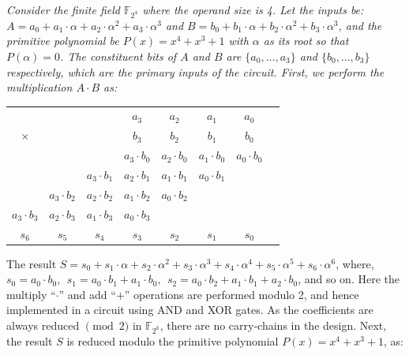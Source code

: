 \begin{Example}
\label{exp1}
{\it 
Consider the finite field $\mathbb{F}_{2^4}$ where the operand size is 4. Let the inputs be:
$A=a_0+a_1\cdot \alpha+a_2\cdot \alpha^2+a_3\cdot \alpha^3$ and
$B=b_0+b_1\cdot \alpha+b_2\cdot \alpha^2+b_3\cdot \alpha^3$, and 
 the primitive polynomial be $P(x)=x^4+x^3+1$ with $\alpha$ as its
 root so that $P(\alpha) = 0$.  
The constituent bits of $A$  and $B$ are $\{a_0, \dots, a_3\}$ and
$\{b_0, \dots, b_3\}$ respectively, which are the primary inputs of
the circuit. First, we perform the multiplication $A\cdot B$ as:


\vspace{0.05in}

{\small
{\begin{tabular}{c c c c c c c c}
  &   &   & $a_3$ & $a_2$ & $a_1$ & $a_0$  \\ 
 $\times$&   &   & $b_3$ & $b_2$ & $b_1$ & $b_0$  \\ 
 \hline
 &   &   & $a_3\cdot b_0$ & $a_2 \cdot b_0$ & $a_1\cdot b_0$ & $a_0\cdot b_0$ \\
 &  & $a_3\cdot b_1$ & $a_2\cdot b_1$ & $a_1 \cdot b_1$ & $a_0\cdot b_1$ &   \\
 & $a_3\cdot b_2$ & $a_2\cdot b_2$ & $a_1\cdot b_2$ & $a_0\cdot b_2$ &  &   \\
 $a_3\cdot b_3$ & $a_2\cdot b_3$ & $a_1\cdot b_3$ & $a_0\cdot b_3$ &  &  &   \\
 \hline
 $s_6$& $s_5$  & $s_4$  & $s_3$ & $s_2$  & $s_1$   & $s_0$ 
\end{tabular}}
}

\vspace{0.05in}

The result $S = s_0+s_1\cdot \alpha + s_2\cdot \alpha^2 + s_3\cdot
\alpha^3 + s_4\cdot \alpha^4 + s_5\cdot \alpha^5 + s_6\cdot \alpha^6$,
where, $s_0  =  a_0\cdot b_0, ~~s_1  =  a_0\cdot b_1 + a_1\cdot b_0,
~~s_2 = a_0\cdot b_2 + a_1\cdot b_1 + a_2\cdot b_0$, and so on. Here
the multiply ``$\cdot$'' and add ``$+$'' operations are performed
modulo 2, and hence implemented in a circuit using AND and XOR
gates. As the coefficients are always reduced $\pmod 2$ in $\mathbb{F}_{2^k}$, there are no carry-chains
in the design. Next, the result $S$ is reduced modulo the primitive
polynomial $P(x) = x^4 + x^3 + 1$, as:

}
\end{Example}

